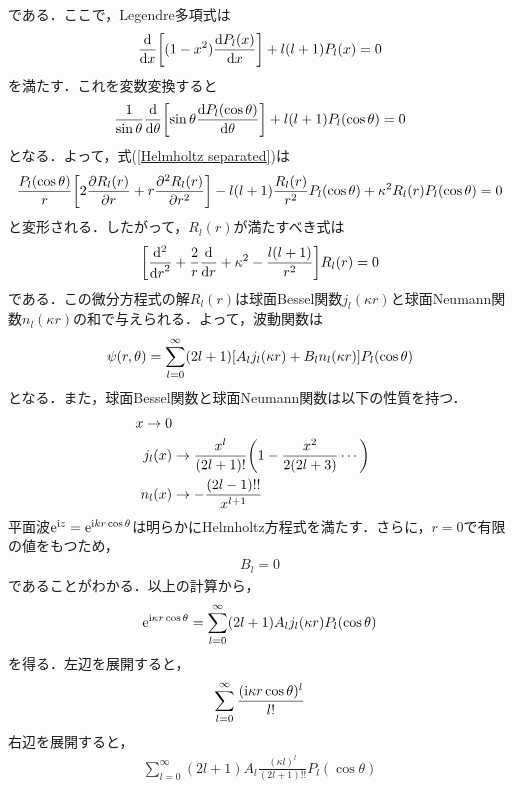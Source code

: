 \documentclass{report}
\begin{document}
  である．ここで，Legendre多項式は
  \begin{align}
    \frac{\mathrm{d}}{\dd{x}}\qty[(1-x^2)\frac{\mathrm{d}P_l(x)}{\dd{x}}] + l(l+1)P_l(x) = 0
  \end{align}
  を満たす．これを変数変換すると
  \begin{align}
    \frac{1}{\sin\theta}\frac{\mathrm{d}}{\dd{\theta}}\qty[\sin\theta\frac{\mathrm{d}P_l(\cos\theta)}{\dd{\theta}}] + l(l+1)P_l(\cos\theta) = 0
  \end{align}
  となる．よって，式(\ref{Helmholtz separated})は
  \begin{align}
    \frac{P_l(\cos\theta)}{r}\qty[2\frac{\partial R_l(r)}{\partial r} + r \frac{\partial^2 R_l(r)}{\partial r^2}]
    - l(l+1)\frac{R_l(r)}{r^2}P_l(\cos\theta)  + \kappa^2 R_l(r)P_l(\cos\theta) = 0
  \end{align}
  と変形される．したがって，$R_l(r)$が満たすべき式は
  \begin{align}
    \qty[\frac{\mathrm{d}^2}{\dd{r}^2} + \frac{2}{r} \dv{}{r} + \kappa^2 - \frac{l(l+1)}{r^2}]R_l(r) = 0
  \end{align}
  である．この微分方程式の解$R_l(r)$は球面Bessel関数$j_l(\kappa r)$と球面Neumann関数$n_l(\kappa r)$の和で与えられる．よって，波動関数は
  \begin{align}
    \psi(r,\theta) = \sum_{l=0}^{\infty} (2l+1)\qty[A_l j_l(\kappa r) + B_l n_l(\kappa r)] P_l(\cos\theta)
  \end{align} 
  となる．また，球面Bessel関数と球面Neumann関数は以下の性質を持つ．
  \begin{align}
    x \to 0 \\
    j_l(x) &\to \frac{x^l}{(2l+1)!}\qty(1 - \frac{x^2}{2(2l+3)}\cdots) \\
    n_l(x) &\to -\frac{(2l -1)!!}{x^{l+1}}
  \end{align}
  平面波$\mathrm{e}^{\mathrm{i}  z} = \mathrm{e}^{\mathrm{i} kr\cos\theta}$は明らかにHelmholtz方程式を満たす．さらに，$r=0$で有限の値をもつため，
  \begin{align}
    B_l =0
  \end{align} 
  であることがわかる．以上の計算から，
  \begin{align}
    \mathrm{e}^{\mathrm{i} \kappa r\cos\theta} = \sum_{l=0}^{\infty} (2l+1)A_l j_l(\kappa r) P_l(\cos\theta)
  \end{align}
  を得る．左辺を展開すると，
  \begin{align}
    \sum_{l=0}^{\infty}\frac{(\mathrm{i} \kappa r \cos\theta)^l}{l!}
  \end{align}
  右辺を展開すると，
  \begin{align}
    \sum_{l=0}^{\infty} (2l+1)A_l\frac{(\kappa l)^l}{(2l+1)!!}P_l(\cos\theta)
  \end{align}
\end{document}
